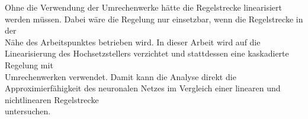 Ohne die Verwendung der Umrechenwerke hätte die Regelstrecke linearisiert werden müssen.
Dabei wäre die Regelung nur einsetzbar, wenn die Regelstrecke in der \\ Nähe des Arbeitspunktes betrieben wird.
In dieser Arbeit wird auf die Linearisierung des Hochsetzstellers verzichtet und stattdessen eine kaskadierte Regelung mit \\ Umrechenwerken verwendet.
Damit kann die Analyse direkt die Approximierfähigkeit des neuronalen Netzes im Vergleich einer linearen und nichtlinearen Regelstrecke \\ untersuchen. \cite{rothstielow2024leistungselektronik} \cite{rothstielow2024regelungstechnik}


